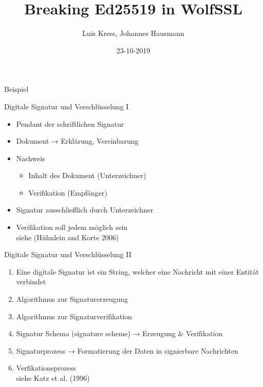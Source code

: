 \documentclass[
  10pt,
  ignorenonframetext,
  aspectratio=169,
]{beamer}
\title{Breaking Ed25519 in WolfSSL}
\author{Luis Kress, Johannes Hausmann}
\date{23-10-2019}
\institute{Technische Hochschule Bingen}
\providecommand{\tightlist}{%
  \setlength{\itemsep}{0pt}\setlength{\parskip}{0pt}}
\begin{document}
\frame{\titlepage}

\begin{frame}
  \tableofcontents[hideallsubsections]
\end{frame}
\begin{frame}{Beispiel}
\protect\hypertarget{beispiel}{}
\end{frame}

\begin{frame}{Digitale Signatur und Verschlüsselung I}
\protect\hypertarget{digitale-signatur-und-verschluxfcsselung-i}{}
\begin{itemize}
\item
  Pendant der schriftlichen Signatur
\item
  Dokument → Erklärung, Vereinbarung
\item
  Nachweis

  \begin{itemize}
  \tightlist
  \item
    Inhalt des Dokument (Unterzeichner)
  \item
    Verifikation (Empfänger)
  \end{itemize}
\item
  Signatur ausschließlich durch Unterzeichner
\item
  Verifikation soll jedem möglich sein\\
  siehe (Hühnlein and Korte 2006)
\end{itemize}
\end{frame}

\begin{frame}{Digitale Signatur und Verschlüsselung II}
\protect\hypertarget{digitale-signatur-und-verschluxfcsselung-ii}{}
\begin{enumerate}
\tightlist
\item
  Eine digitale Signatur ist ein String, welcher eine Nachricht mit
  einer Entität verbindet
\item
  Algorithmus zur Signaturerzeugung\\
\item
  Algorithmus zur Signaturverifikation
\item
  Signatur Schema (signature scheme) → Erzeugung \& Verifikation
\item
  Signaturprozess → Formatierung der Daten in signierbare Nachrichten
\item
  Verfikationsprozess\\
  siehe Katz et al. (1996)
\end{enumerate}
\end{frame}
\end{document}

